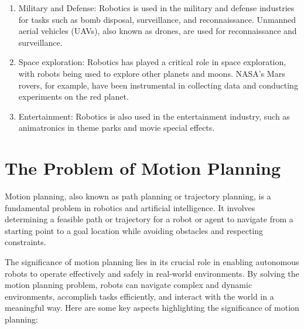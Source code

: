 \begin{enumerate}
    \item Military and Defense: Robotics is used in the military and defense industries for tasks such as bomb disposal, surveillance, and reconnaissance. Unmanned aerial vehicles (UAVs), also known as drones, are used for reconnaissance and surveillance.

    \item Space exploration: Robotics has played a critical role in space exploration, with robots being used to explore other planets and moons. NASA's Mars rovers, for example, have been instrumental in collecting data and conducting experiments on the red planet.



    \item Entertainment: Robotics is also used in the entertainment industry, such as animatronics in theme parks and movie special effects.
\end{enumerate}

\section{The Problem of Motion Planning}

Motion planning, also known as path planning or trajectory planning, is a fundamental problem in robotics and artificial intelligence. It involves determining a feasible path or trajectory for a robot or agent to navigate from a starting point to a goal location while avoiding obstacles and respecting constraints.

The significance of motion planning lies in its crucial role in enabling autonomous robots to operate effectively and safely in real-world environments. By solving the motion planning problem, robots can navigate complex and dynamic environments, accomplish tasks efficiently, and interact with the world in a meaningful way. Here are some key aspects highlighting the significance of motion planning:

